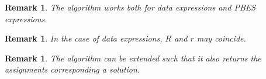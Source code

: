 \documentclass{article}
\newtheorem{remark}[theorem]{Remark}
\begin{document}
\begin{remark}
The algorithm works both for data expressions and PBES expressions.
\end{remark}

\begin{remark}
In the case of data expressions, $R$ and $r$ may coincide.%
\end{remark}

\begin{remark}
The algorithm can be extended such that it also returns the assignments
corresponding a solution.
\end{remark}
\end{document}

